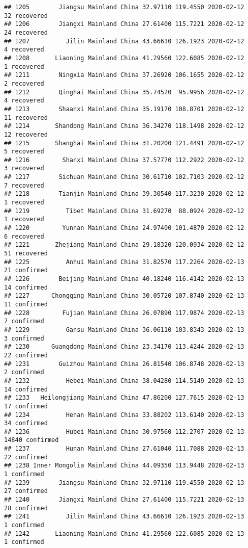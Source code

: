 \documentclass[
]{article}
\begin{document}
\begin{verbatim}
## 1205        Jiangsu Mainland China 32.97110 119.4550 2020-02-12    32 recovered
## 1206        Jiangxi Mainland China 27.61400 115.7221 2020-02-12    24 recovered
## 1207          Jilin Mainland China 43.66610 126.1923 2020-02-12     4 recovered
## 1208       Liaoning Mainland China 41.29560 122.6085 2020-02-12     1 recovered
## 1211        Ningxia Mainland China 37.26920 106.1655 2020-02-12     2 recovered
## 1212        Qinghai Mainland China 35.74520  95.9956 2020-02-12     4 recovered
## 1213        Shaanxi Mainland China 35.19170 108.8701 2020-02-12    11 recovered
## 1214       Shandong Mainland China 36.34270 118.1498 2020-02-12    12 recovered
## 1215       Shanghai Mainland China 31.20200 121.4491 2020-02-12     5 recovered
## 1216         Shanxi Mainland China 37.57770 112.2922 2020-02-12     3 recovered
## 1217        Sichuan Mainland China 30.61710 102.7103 2020-02-12     7 recovered
## 1218        Tianjin Mainland China 39.30540 117.3230 2020-02-12     1 recovered
## 1219          Tibet Mainland China 31.69270  88.0924 2020-02-12     1 recovered
## 1220         Yunnan Mainland China 24.97400 101.4870 2020-02-12     6 recovered
## 1221       Zhejiang Mainland China 29.18320 120.0934 2020-02-12    51 recovered
## 1225          Anhui Mainland China 31.82570 117.2264 2020-02-13    21 confirmed
## 1226        Beijing Mainland China 40.18240 116.4142 2020-02-13    14 confirmed
## 1227      Chongqing Mainland China 30.05720 107.8740 2020-02-13    11 confirmed
## 1228         Fujian Mainland China 26.07890 117.9874 2020-02-13     7 confirmed
## 1229          Gansu Mainland China 36.06110 103.8343 2020-02-13     3 confirmed
## 1230      Guangdong Mainland China 23.34170 113.4244 2020-02-13    22 confirmed
## 1231        Guizhou Mainland China 26.81540 106.8748 2020-02-13     2 confirmed
## 1232          Hebei Mainland China 38.04280 114.5149 2020-02-13    14 confirmed
## 1233   Heilongjiang Mainland China 47.86200 127.7615 2020-02-13    17 confirmed
## 1234          Henan Mainland China 33.88202 113.6140 2020-02-13    34 confirmed
## 1236          Hubei Mainland China 30.97560 112.2707 2020-02-13 14840 confirmed
## 1237          Hunan Mainland China 27.61040 111.7088 2020-02-13    22 confirmed
## 1238 Inner Mongolia Mainland China 44.09350 113.9448 2020-02-13     1 confirmed
## 1239        Jiangsu Mainland China 32.97110 119.4550 2020-02-13    27 confirmed
## 1240        Jiangxi Mainland China 27.61400 115.7221 2020-02-13    28 confirmed
## 1241          Jilin Mainland China 43.66610 126.1923 2020-02-13     1 confirmed
## 1242       Liaoning Mainland China 41.29560 122.6085 2020-02-13     1 confirmed

\end{verbatim}
\end{document}
